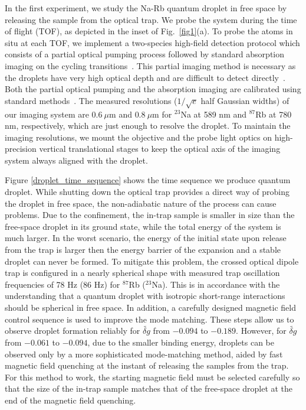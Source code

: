 In the first experiment, we study the Na-Rb quantum droplet in free space by releasing the sample from the optical trap. We probe the system during the time of flight (TOF), as depicted in the inset of Fig.~\ref{fig1}(a). To probe the atoms in situ at each TOF, we implement a two-species high-field detection protocol which consists of a partial optical pumping process followed by standard absorption imaging on the cycling transitions~\cite{jia2020}. This partial imaging method is necessary as the droplets have very high optical depth and are difficult to detect directly~\cite{ramanathan2012partial,semeghini2018self}. Both the partial optical pumping and the absorption imaging are calibrated using standard methods~\cite{reinaudi2007strong,hueck2017calibrating}. The measured resolutions ($1/\sqrt{e}$ half Gaussian widths) of our imaging system are $0.6~\mu$m and $0.8~\mu$m for $^{23}$Na at 589 nm and $^{87}$Rb at 780 nm, respectively, which are just enough to resolve the droplet. To maintain the imaging resolutions, we mount the objective and the probe light optics on high-precision vertical translational stages to keep the optical axis of the imaging system always aligned with the droplet.

Figure \ref{droplet_time_sequence} shows the time sequence we produce quantum droplet. While shutting down the optical trap provides a direct way of probing the droplet in free space, the non-adiabatic nature of the process can cause problems. Due to the confinement, the in-trap sample is smaller in size than the free-space droplet in its ground state, while the total energy of the system is much larger. In the worst scenario, the energy of the initial state upon release from the trap is larger then the energy barrier of the expansion and a stable droplet can never be formed. To mitigate this problem, the crossed optical dipole trap is configured in a nearly spherical shape with measured trap oscillation frequencies of 78 Hz (86 Hz) for $^{87}$Rb ($^{23}$Na). This is in accordance with the understanding that a quantum droplet with isotropic short-range interactions should be spherical in free space. In addition, a carefully designed magnetic field control sequence is used to improve the mode matching. These steps allow us to observe droplet formation reliably for $\widetilde{\delta g}$ from $-0.094$ to $-0.189$. However, for $\widetilde{\delta g}$ from $-0.061$ to $-0.094$, due to the smaller binding energy, droplets can be observed only by a more sophisticated mode-matching method, aided by fast magnetic field quenching at the instant of releasing the samples from the trap. For this method to work, the starting magnetic field must be selected carefully so that the size of the in-trap sample matches that of the free-space droplet at the end of the magnetic field quenching.

